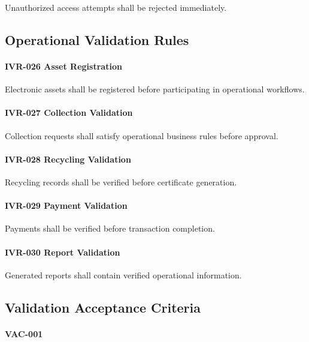 Unauthorized access attempts shall be rejected immediately.


\subsection{Operational Validation Rules}

\paragraph{IVR-026 Asset Registration}

Electronic assets shall be registered before participating in
operational workflows.

\paragraph{IVR-027 Collection Validation}

Collection requests shall satisfy operational business rules before
approval.

\paragraph{IVR-028 Recycling Validation}

Recycling records shall be verified before certificate generation.

\paragraph{IVR-029 Payment Validation}

Payments shall be verified before transaction completion.

\paragraph{IVR-030 Report Validation}

Generated reports shall contain verified operational information.


\subsection*{Validation Acceptance Criteria}

\paragraph{VAC-001}

